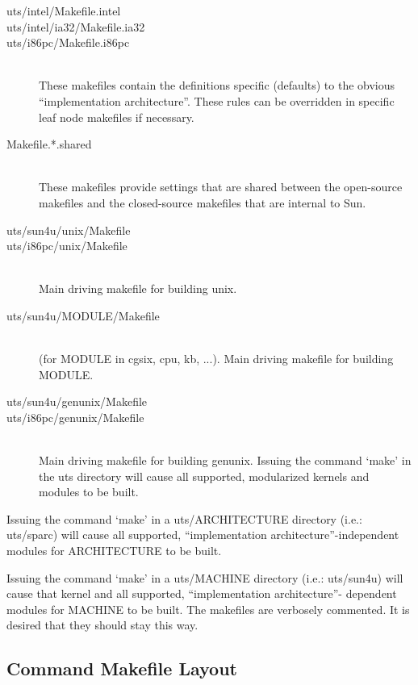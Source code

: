 \documentclass{article}
\begin{document}
\begin{description}
\item[uts/intel/Makefile.intel]
\item[uts/intel/ia32/Makefile.ia32]
\item[uts/i86pc/Makefile.i86pc] \hfill \\
  These makefiles contain the definitions specific (defaults) to the obvious
  ``implementation architecture''. These rules can be overridden in specific
  leaf node makefiles if necessary.
\vspace{0.2cm}
\item[Makefile.*.shared] \hfill \\
  These makefiles provide settings that are shared between the open-source
  makefiles and the closed-source makefiles that are internal to Sun.
\item[uts/sun4u/unix/Makefile]
\item[uts/i86pc/unix/Makefile] \hfill \\
  Main driving makefile for building unix.
\vspace{0.1cm}
\item[uts/sun4u/MODULE/Makefile] \hfill \\
  (for MODULE in cgsix, cpu, kb, ...). Main driving makefile for building
  MODULE.
\vspace{0.1cm}
\item[uts/sun4u/genunix/Makefile]
\item[uts/i86pc/genunix/Makefile] \hfill \\
  Main driving makefile for building genunix. Issuing the command `make' in the
  uts directory will cause all supported, modularized kernels and modules to be
  built.

\end{description}

Issuing the command `make' in a uts/ARCHITECTURE directory (i.e.: uts/sparc)
will cause all supported, ``implementation architecture''-independent modules
for ARCHITECTURE to be built.

Issuing the command `make' in a uts/MACHINE directory (i.e.: uts/sun4u) will
cause that kernel and all supported, ``implementation architecture''- dependent
modules for MACHINE to be built. The makefiles are verbosely commented. It is
desired that they should stay this way.

\subsection*{Command Makefile Layout}
\end{document}
